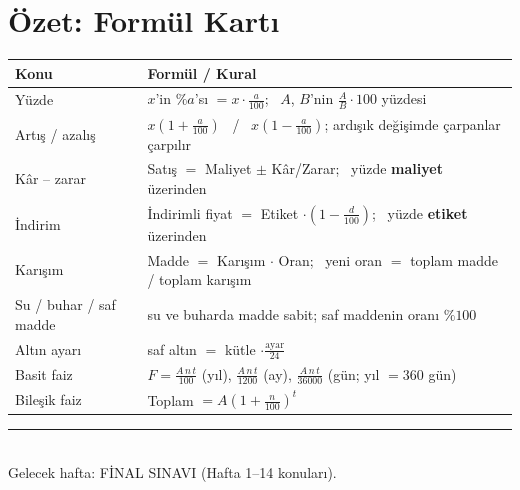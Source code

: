\documentclass[11pt,a4paper]{article}
\newcounter{alis}
\begin{document}
\section{Özet: Formül Kartı}
\begin{center}
\renewcommand{\arraystretch}{1.6}
\begin{tabular}{@{}ll@{}}
\toprule
Konu & Formül / Kural\\\midrule
Yüzde & \(x\)'in \(\%a\)'sı \(=x\cdot\frac{a}{100}\); \ \(A\), \(B\)'nin \(\frac{A}{B}\cdot 100\) yüzdesi\\
Artış / azalış & \(x\left(1+\frac{a}{100}\right)\) \ / \ \(x\left(1-\frac{a}{100}\right)\); ardışık değişimde çarpanlar çarpılır\\
Kâr -- zarar & Satış \(=\) Maliyet \(\pm\) Kâr/Zarar; \ yüzde \textbf{maliyet} üzerinden\\
İndirim & İndirimli fiyat \(=\) Etiket \(\cdot\left(1-\frac{d}{100}\right)\); \ yüzde \textbf{etiket} üzerinden\\
Karışım & Madde \(=\) Karışım \(\cdot\) Oran; \ yeni oran \(=\) toplam madde / toplam karışım\\
Su / buhar / saf madde & su ve buharda madde sabit; saf maddenin oranı \(\%100\)\\
Altın ayarı & saf altın \(=\) kütle \(\cdot\frac{\text{ayar}}{24}\)\\
Basit faiz & \(F=\frac{A\,n\,t}{100}\) (yıl), \(\frac{A\,n\,t}{1200}\) (ay), \(\frac{A\,n\,t}{36000}\) (gün; yıl \(=360\) gün)\\
Bileşik faiz & Toplam \(=A\left(1+\frac{n}{100}\right)^t\)\\\bottomrule
\end{tabular}
\end{center}

\newpage


\vspace{6pt}
\noindent\textcolor{anamavi}{\rule{\textwidth}{0.5pt}}\\
{\small Gelecek hafta: FİNAL SINAVI (Hafta 1--14 konuları).}
\end{document}
